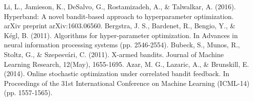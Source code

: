 \documentclass[runningheads,a4paper]{llncs}
\begin{document}
\begin{thebibliography}{4}

 Li, L., Jamieson, K., DeSalvo, G., Rostamizadeh, A., \& Talwalkar, A. (2016). Hyperband: A novel bandit-based approach to hyperparameter optimization. arXiv preprint arXiv:1603.06560.
 Bergstra, J. S., Bardenet, R., Bengio, Y., \& Kégl, B. (2011). Algorithms for hyper-parameter optimization. In Advances in neural information processing systems (pp. 2546-2554).
 Bubeck, S., Munos, R., Stoltz, G., \& Szepesvári, C. (2011). X-armed bandits. Journal of Machine Learning Research, 12(May), 1655-1695.
 Azar, M. G., Lazaric, A., \& Brunskill, E. (2014). Online stochastic optimization under correlated bandit feedback. In Proceedings of the 31st International Conference on Machine Learning (ICML-14) (pp. 1557-1565).

\end{thebibliography}


\end{document}
